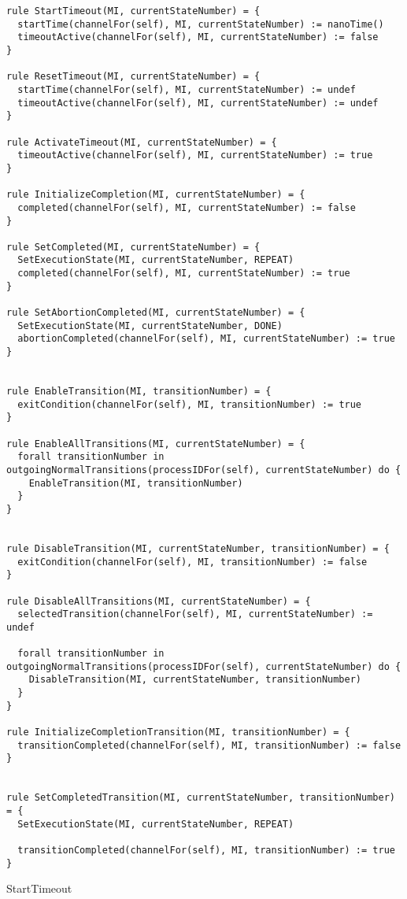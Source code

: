 \begin{listing}[H]
\begin{verbatim}
rule StartTimeout(MI, currentStateNumber) = {
  startTime(channelFor(self), MI, currentStateNumber) := nanoTime()
  timeoutActive(channelFor(self), MI, currentStateNumber) := false
}

rule ResetTimeout(MI, currentStateNumber) = {
  startTime(channelFor(self), MI, currentStateNumber) := undef
  timeoutActive(channelFor(self), MI, currentStateNumber) := undef
}

rule ActivateTimeout(MI, currentStateNumber) = {
  timeoutActive(channelFor(self), MI, currentStateNumber) := true
}

rule InitializeCompletion(MI, currentStateNumber) = {
  completed(channelFor(self), MI, currentStateNumber) := false
}

rule SetCompleted(MI, currentStateNumber) = {
  SetExecutionState(MI, currentStateNumber, REPEAT)
  completed(channelFor(self), MI, currentStateNumber) := true
}

rule SetAbortionCompleted(MI, currentStateNumber) = {
  SetExecutionState(MI, currentStateNumber, DONE)
  abortionCompleted(channelFor(self), MI, currentStateNumber) := true
}


rule EnableTransition(MI, transitionNumber) = {
  exitCondition(channelFor(self), MI, transitionNumber) := true
}

rule EnableAllTransitions(MI, currentStateNumber) = {
  forall transitionNumber in outgoingNormalTransitions(processIDFor(self), currentStateNumber) do {
    EnableTransition(MI, transitionNumber)
  }
}


rule DisableTransition(MI, currentStateNumber, transitionNumber) = {
  exitCondition(channelFor(self), MI, transitionNumber) := false
}

rule DisableAllTransitions(MI, currentStateNumber) = {
  selectedTransition(channelFor(self), MI, currentStateNumber) := undef

  forall transitionNumber in outgoingNormalTransitions(processIDFor(self), currentStateNumber) do {
    DisableTransition(MI, currentStateNumber, transitionNumber)
  }
}

rule InitializeCompletionTransition(MI, transitionNumber) = {
  transitionCompleted(channelFor(self), MI, transitionNumber) := false
}


rule SetCompletedTransition(MI, currentStateNumber, transitionNumber) = {
  SetExecutionState(MI, currentStateNumber, REPEAT)

  transitionCompleted(channelFor(self), MI, transitionNumber) := true
}
\end{verbatim}
\caption{StartTimeout}
\label{lst:asm:StartTimeout}
\end{listing}





